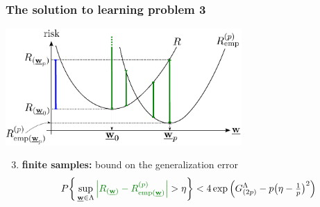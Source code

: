 \begin{frame}\frametitle{The solution to learning problem 3} 
	\begin{center}
		\includegraphics[width=9cm]{img/section2_fig1_question2_lessw}
	\end{center}
	\begin{enumerate}\setcounter{enumi}{2}
		\item \textbf{finite samples:} bound on the generalization error
			\vspace{-2mm}
			\begin{equation}
				P\bigg\{ \sup\limits_{\vec w \in \Lambda}
					{\color{question2} 
						\Big|R_{(\vec w)} - R^{(p)}_{\text{emp}(\vec w)}\Big| 
					} > \eta
				\bigg\} < 4 \exp\Big( G^\Lambda_{(2p)} 
					- p \big( \eta - \smallfrac{1}{p} \big)^2 \Big)
					\label{eq:boundgenerlization}
			\end{equation}
			\vspace{-4mm}
	\end{enumerate}
\end{frame}
